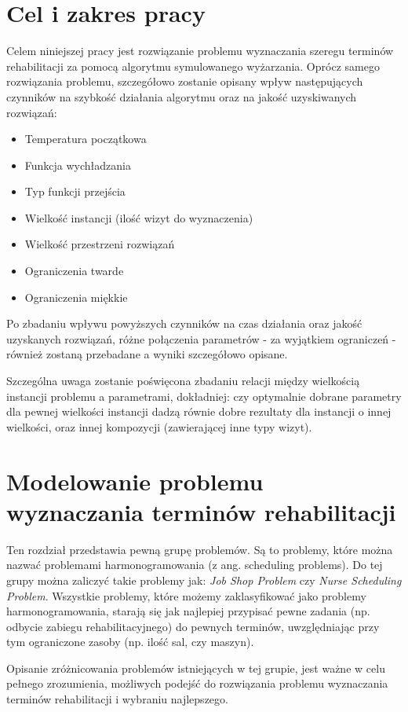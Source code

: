 \chapter{Cel i zakres pracy}
Celem niniejszej pracy jest rozwiązanie problemu wyznaczania szeregu terminów rehabilitacji za pomocą algorytmu symulowanego wyżarzania. Oprócz samego rozwiązania problemu, szczegółowo zostanie opisany wpływ następujących czynników na szybkość działania algorytmu oraz na jakość uzyskiwanych rozwiązań:

\begin{itemize}
\item Temperatura początkowa
\item Funkcja wychładzania
\item Typ funkcji przejścia
\item Wielkość instancji (ilość wizyt do wyznaczenia)
\item Wielkość przestrzeni rozwiązań
\item Ograniczenia twarde
\item Ograniczenia miękkie
\end{itemize}
Po zbadaniu wpływu powyższych czynników na czas działania oraz jakość uzyskanych rozwiązań, różne połączenia parametrów - za wyjątkiem ograniczeń - również zostaną przebadane a wyniki szczegółowo opisane.

Szczególna uwaga zostanie poświęcona zbadaniu relacji między wielkością instancji problemu a parametrami, dokładniej: czy optymalnie dobrane parametry dla pewnej wielkości instancji dadzą równie dobre rezultaty dla instancji o innej wielkości, oraz innej kompozycji (zawierającej inne typy wizyt).

\chapter{Modelowanie problemu wyznaczania terminów rehabilitacji}
Ten rozdział przedstawia pewną grupę problemów. Są to problemy,
które można nazwać problemami harmonogramowania (z ang. scheduling problems).
Do tej grupy można zaliczyć takie problemy jak: \emph{Job Shop Problem} czy
\emph{Nurse Scheduling Problem}. Wszystkie problemy, które możemy zaklasyfikować
jako problemy harmonogramowania, starają się jak najlepiej przypisać pewne
zadania (np. odbycie zabiegu rehabilitacyjnego) do pewnych terminów, uwzględniając przy tym ograniczone zasoby (np. ilość
sal, czy maszyn).

Opisanie zróżnicowania problemów istniejących w tej grupie, jest ważne w celu pełnego
zrozumienia, możliwych podejść do rozwiązania problemu wyznaczania
terminów rehabilitacji i wybraniu najlepszego.

